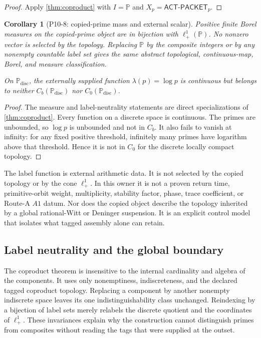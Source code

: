 \documentclass[11pt]{article}
\newtheorem{corollary}[theorem]{Corollary}
\theoremstyle{definition}
\newcommand{\Pp}{\mathbb P}
\newcommand{\ACTP}{\mathsf{ACT\mbox{-}PACKET}_p}
\begin{document}
\begin{proof}
Apply \cref{thm:coproduct} with $I=\Pp$ and $X_p=\ACTP$.
\end{proof}
\medskip

\begin{corollary}[P10-8: copied-prime mass and external scalar]
\label{cor:primemass}
Positive finite Borel measures on the copied-prime object are in bijection with $\ell^1_+(\Pp)$.  No nonzero vector is selected by the topology.  Replacing $\Pp$ by the composite integers or by any nonempty countable label set gives the same abstract topological, continuous-map, Borel, and measure classification.

On $\Pp_{\mathrm{disc}}$, the externally supplied function $\lambda(p)=\log p$ is continuous but belongs to neither $C_b(\Pp_{\mathrm{disc}})$ nor $C_0(\Pp_{\mathrm{disc}})$.
\end{corollary}

\begin{proof}
The measure and label-neutrality statements are direct specializations of \cref{thm:coproduct}.  Every function on a discrete space is continuous.  The primes are unbounded, so $\log p$ is unbounded and not in $C_b$.  It also fails to vanish at infinity: for any fixed positive threshold, infinitely many primes have logarithm above that threshold.  Hence it is not in $C_0$ for the discrete locally compact topology.
\end{proof}

The label function is external arithmetic data.  It is not selected by the copied topology or by the cone $\ell^1_+$.  In this owner it is not a proven return time, primitive-orbit weight, multiplicity, stability factor, phase, trace coefficient, or Route-A $A1$ datum.  Nor does the copied object describe the topology inherited by a global rational-Witt or Deninger suspension.  It is an explicit control model that isolates what tagged assembly alone can retain.

\subsection{Label neutrality and the global boundary}

The coproduct theorem is insensitive to the internal cardinality and algebra of the components.  It uses only nonemptiness, indiscreteness, and the declared tagged coproduct topology.  Replacing a component by another nonempty indiscrete space leaves its one indistinguishability class unchanged.  Reindexing by a bijection of label sets merely relabels the discrete quotient and the coordinates of $\ell^1_+$.  These invariances explain why the construction cannot distinguish primes from composites without reading the tags that were supplied at the outset.
\end{document}
